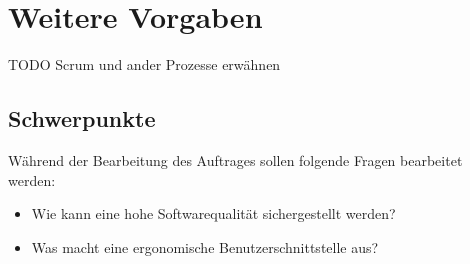 \section{Weitere Vorgaben}
TODO Scrum und ander Prozesse erwähnen

\subsection{Schwerpunkte}
Während der Bearbeitung des Auftrages sollen folgende Fragen bearbeitet werden:
\begin{itemize}
   \item Wie kann eine hohe Softwarequalität sichergestellt werden?
   \item Was macht eine ergonomische Benutzerschnittstelle aus?
\end{itemize}